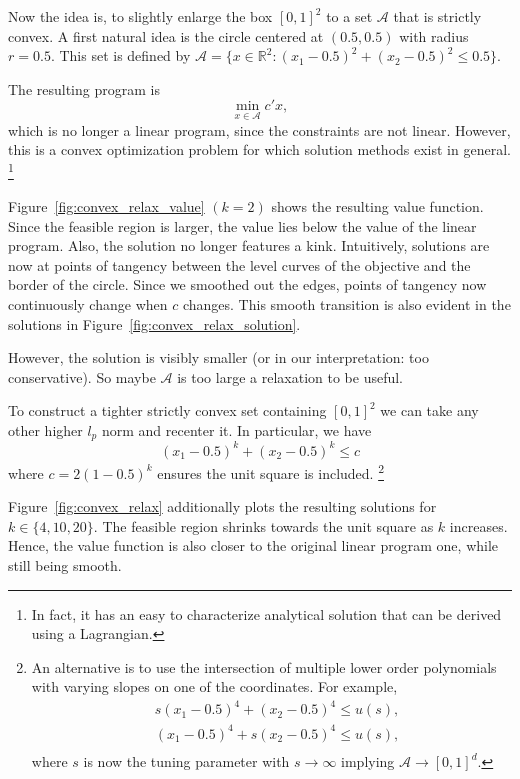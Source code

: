 \documentclass[12pt,a4paper,english]{article} %
\numberwithin{equation}{section}
\theoremstyle{definition}
\theoremstyle{remark}
\theoremstyle{plain}
\begin{document}
Now the idea is, to slightly enlarge the box $[0,1]^2$ to a set $\mathcal{A}$ that is strictly convex.
A first natural idea is the circle centered at $(0.5, 0.5)$ with radius $r=0.5$.
This set is defined by $\mathcal{A} = \{x \in \mathbb{R}^2: (x_1 - 0.5)^2 + (x_2 - 0.5)^2 \leq 0.5\}$.

The resulting program is
\begin{equation}
	\min_{x\in\mathcal{A}} c'x,
\end{equation}
which is no longer a linear program, since the constraints are not linear.
However, this is a convex optimization problem for which solution methods exist in general.
\footnote{In fact, it has an easy to characterize analytical solution that can be derived using a Lagrangian.}

Figure~\ref{fig:convex_relax_value} $(k=2)$ shows the resulting value function.
Since the feasible region is larger, the value lies below the value of the linear program.
Also, the solution no longer features a kink.
Intuitively, solutions are now at points of tangency between the level curves of the objective and the border of the circle.
Since we smoothed out the edges, points of tangency now continuously change when $c$ changes.
This smooth transition is also evident in the solutions in Figure~\ref{fig:convex_relax_solution}.

However, the solution is visibly smaller (or in our interpretation: too conservative).
So maybe $\mathcal{A}$ is too large a relaxation to be useful.

To construct a tighter strictly convex set containing $[0,1]^2$ we can take any other higher $l_p$ norm and recenter it.
In particular, we have
\begin{equation*}
	(x_1-0.5)^k + (x_2-0.5)^k \leq c
\end{equation*}
where $c = 2(1-0.5)^k$ ensures the unit square is included.
\footnote{An alternative is to use the intersection of multiple lower order polynomials with varying slopes on one of the coordinates. For example,
\begin{align}
	& s(x_1 - 0.5)^4 + (x_2 - 0.5)^4 \leq u(s), \\
	& (x_1 - 0.5)^4 + s(x_2 - 0.5)^4 \leq u(s), \\
\end{align}
where $s$ is now the tuning parameter with $s\to\infty$ implying $\mathcal{A} \to [0,1]^d$.}

Figure~\ref{fig:convex_relax} additionally plots the resulting solutions for $k\in\{4, 10, 20\}$.
The feasible region shrinks towards the unit square as $k$ increases.
Hence, the value function is also closer to the original linear program one, while still being smooth.
\end{document}
